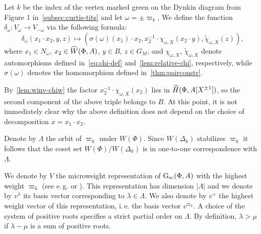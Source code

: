 \begin{dfn} \label{sigma-def}
  Let $k$ be the index of the vertex marked green on the Dynkin diagram from Figure 1 in~\cref{subsec:curtis-tits} and let $\omega = \pm \varpi_k$,
  We define the function $\delta_\omega \colon V_\omega \to V_{-\omega}$ via the following formula:
  \begin{equation} \label{eq:sigma-def} \delta_\omega(x_1 \cdot x_2, y, z) \mapsto (\sigma(\omega)(x_1)\cdot x_2, x_2^{-1} \cdot \chi_{\omega, X}(x_2 \cdot y), \widetilde{\chi}_{\omega, X}(z)), \end{equation}
  where $x_1 \in N_\omega$, $x_2 \in \widehat{W}(\Phi, A)$, $y \in B$, $z \in G_M$, and
  $\chi_{\omega, X}$, $\widetilde{\chi}_{\omega, X}$ denote automorphisms defined in~\eqref{eq:chi-def} and~\cref{lem:relative-chi}, respectively,
  while $\sigma(\omega)$ denotes the homomorphism defined in~\cref{thm:pairconstr}.
\end{dfn}
By~\cref{lem:winv-chiw} the factor $x_2^{-1} \cdot \chi_{\omega, X}(x_2)$ lies in $\widehat{H}(\Phi, A[X^{\pm 1}])$,
 so the second component of the above triple belongs to $B$.
At this point, it is not immediately clear why the above definition does not depend on the choice of decomposition $x = x_1 \cdot x_2$.

Denote by $\Lambda$ the orbit of $\varpi_k$ under $W(\Phi)$.
Since $W(\Delta_k)$ stabilizes $\varpi_k$ it follows that the coset set $W(\Phi)/W(\Delta_k)$ is in one-to-one correspondence with $\Lambda$.

We denote by $V$ the microweight representation of $\operatorname{G}_\mathrm{sc}(\Phi, A)$ with the highest weight $\varpi_k$ (see e.\,g. \cite[\S~2]{Ge17} or \cite[\S~1.1]{V00}).
This representation has dimension $|\Lambda|$ and we denote by $v^\lambda$ its basis vector corresponding to $\lambda \in \Lambda$.
We also denote by $v^+$ the highest weight vector of this representation, i.\,e. the basis vector $v^{\varpi_k}$.
A choice of the system of positive roots specifies a strict partial order on $\Lambda$.
By definition, $\lambda > \mu$ if $\lambda - \mu$ is a sum of positive roots.

